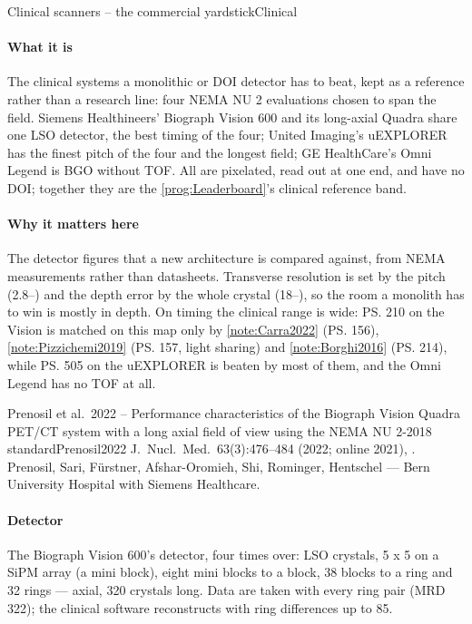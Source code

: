 \begin{programnote}{Clinical scanners -- the commercial yardstick}{Clinical}

\paragraph{What it is}
The clinical systems a monolithic or DOI detector has to beat, kept as a
reference rather than a research line: four NEMA NU 2 evaluations chosen to
span the field. Siemens Healthineers' Biograph Vision 600 and its long-axial
Quadra share one LSO detector, the best timing of the four; United
Imaging's uEXPLORER has the finest pitch of the four and the longest field; GE
HealthCare's Omni Legend is BGO without TOF. All are pixelated, read out at
one end, and have no DOI; together they are the \ref{prog:Leaderboard}'s
clinical reference band.

\paragraph{Why it matters here}
The detector figures that a new architecture is compared against, from NEMA
measurements rather than datasheets. Transverse resolution is set by the pitch
(2.8--) and the depth error by the whole crystal (18--), so the
room a monolith has to win is mostly in depth. On timing the clinical range is
wide: \ps{210} on the Vision is matched on this map only by
\ref{note:Carra2022} (\ps{156}), \ref{note:Pizzichemi2019} (\ps{157}, light
sharing) and \ref{note:Borghi2016} (\ps{214}), while \ps{505} on the
uEXPLORER is beaten by most of them, and the Omni Legend has no TOF at all.

\begin{papernote}{Prenosil et al.\ 2022 -- Performance characteristics of the Biograph Vision Quadra PET/CT system with a long axial field of view using the NEMA NU 2-2018 standard}{Prenosil2022}
J.\ Nucl.\ Med.\ 63(3):476--484 (2022; online 2021),
. Prenosil, Sari, Fürstner, Afshar-Oromieh,
Shi, Rominger, Hentschel --- Bern University Hospital with Siemens Healthcare.

\paragraph{Detector}
The Biograph Vision 600's detector, four times over:  LSO crystals, 5 x 5 on a  SiPM array (a
mini block), eight mini blocks to a block, 38 blocks to a ring and 32 rings ---
 axial, 320 crystals long. Data are taken with every ring pair (MRD
322); the clinical software reconstructs with ring differences up to 85.


\end{papernote}
\end{programnote}
